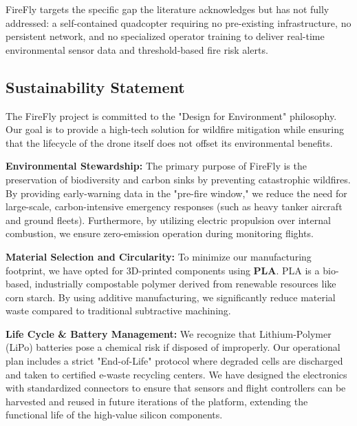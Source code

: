 \documentclass[journal, onecolumn]{IEEEtran}
\begin{document}
FireFly targets the specific gap the literature acknowledges but has not fully addressed: a self-contained quadcopter requiring no pre-existing infrastructure, no persistent network, and no specialized operator training to deliver real-time environmental sensor data and threshold-based fire risk alerts.

\subsection{Sustainability Statement}

The FireFly project is committed to the "Design for Environment" philosophy. Our goal is to provide a high-tech solution for wildfire mitigation while ensuring that the lifecycle of the drone itself does not offset its environmental benefits.

\vspace{1em}


\textbf{Environmental Stewardship:} 
The primary purpose of FireFly is the preservation of biodiversity and carbon sinks by preventing catastrophic wildfires. By providing early-warning data in the "pre-fire window," we reduce the need for large-scale, carbon-intensive emergency responses (such as heavy tanker aircraft and ground fleets). Furthermore, by utilizing electric propulsion over internal combustion, we ensure zero-emission operation during monitoring flights.

\vspace{1em}


\textbf{Material Selection and Circularity:} 
To minimize our manufacturing footprint, we have opted for 3D-printed components using \textbf{PLA}. PLA is a bio-based, industrially compostable polymer derived from renewable resources like corn starch. By using additive manufacturing, we significantly reduce material waste compared to traditional subtractive machining.

\vspace{1em}


\textbf{Life Cycle \& Battery Management:} 
We recognize that Lithium-Polymer (LiPo) batteries pose a chemical risk if disposed of improperly. Our operational plan includes a strict "End-of-Life" protocol where degraded cells are discharged and taken to certified e-waste recycling centers. We have designed the electronics with standardized connectors to ensure that sensors and flight controllers can be harvested and reused in future iterations of the platform, extending the functional life of the high-value silicon components.
\end{document}
